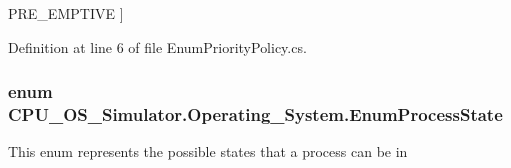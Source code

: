 \begin{Desc}
\begin{description}
{\hypertarget{namespace_c_p_u___o_s___simulator_1_1_operating___system_a3a9286a473bd079e9c65908c0378fa00a952140b26aa6080871aab2eb7a96feb0}{}P\+R\+E\+\_\+\+E\+M\+P\+T\+I\+V\+E\label{namespace_c_p_u___o_s___simulator_1_1_operating___system_a3a9286a473bd079e9c65908c0378fa00a952140b26aa6080871aab2eb7a96feb0}
}]\end{description}
\end{Desc}


Definition at line 6 of file Enum\+Priority\+Policy.\+cs.

\hypertarget{namespace_c_p_u___o_s___simulator_1_1_operating___system_a836ee2204e78fcb3a7dd6c3c942b1a24}{}
\subsubsection[{Enum\+Process\+State}]{\setlength{\rightskip}{0pt plus 5cm}enum {\bf C\+P\+U\+\_\+\+O\+S\+\_\+\+Simulator.\+Operating\+\_\+\+System.\+Enum\+Process\+State}\hspace{0.3cm}{\ttfamily [strong]}}\label{namespace_c_p_u___o_s___simulator_1_1_operating___system_a836ee2204e78fcb3a7dd6c3c942b1a24}


This enum represents the possible states that a process can be in 

